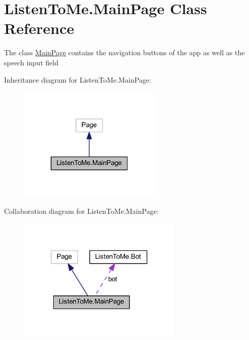 \hypertarget{class_listen_to_me_1_1_main_page}{}\section{Listen\+To\+Me.\+Main\+Page Class Reference}
\label{class_listen_to_me_1_1_main_page}


The class \hyperlink{class_listen_to_me_1_1_main_page}{Main\+Page} contains the navigation buttons of the app as well as the speech input field  




Inheritance diagram for Listen\+To\+Me.\+Main\+Page\+:
\nopagebreak
\begin{figure}[H]
\begin{center}
\leavevmode
\includegraphics[width=193pt]{class_listen_to_me_1_1_main_page__inherit__graph}
\end{center}
\end{figure}


Collaboration diagram for Listen\+To\+Me.\+Main\+Page\+:
\nopagebreak
\begin{figure}[H]
\begin{center}
\leavevmode
\includegraphics[width=222pt]{class_listen_to_me_1_1_main_page__coll__graph}
\end{center}
\end{figure}
